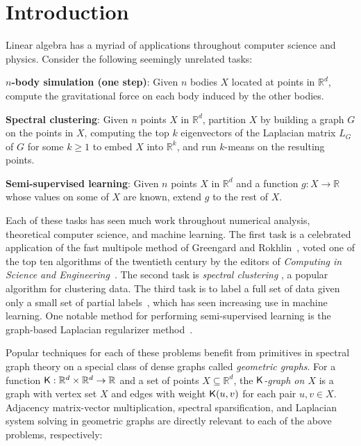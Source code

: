 \section{Introduction}\label{sec:intro}

Linear algebra has a myriad of applications throughout computer science and physics. Consider the following seemingly unrelated tasks:

\vspace{1mm}
\begin{compactenum}
    \item \textbf{$n$-body simulation (one step)}: Given $n$ bodies $X$ located at points in $\mathbb{R}^d$, compute the gravitational force on each body induced by the other bodies.
    \item \textbf{Spectral clustering}: Given $n$ points $X$ in $\mathbb{R}^d$, partition $X$ by building a graph $G$ on the points in $X$, computing the top $k$ eigenvectors of the Laplacian matrix $L_G$ of $G$ for some $k\ge 1$ to embed $X$ into $\mathbb{R}^k$, and run $k$-means on the resulting points.
    \item \textbf{Semi-supervised learning}: Given $n$ points $X$ in $\mathbb{R}^d$ and a function $g:X\rightarrow \mathbb{R}$ whose values on some of $X$ are known, extend $g$ to the rest of $X$.
\end{compactenum}

\vspace{1mm}

Each of these tasks has seen much work throughout numerical analysis, theoretical computer science, and machine learning. The first task is a celebrated application of the fast multipole method of Greengard and Rokhlin~\cite{gr87, gr88, gr89}, voted one of the top ten algorithms of the twentieth century by the editors of \emph{Computing in Science and Engineering}~\cite{dongarra2000guest}.
The second task is \emph{spectral clustering} \cite{njw02, lwdh13}, a popular algorithm for clustering data. The third task is to label a full set of data given only a small set of partial labels~\cite{z05survey, csbz09, zl05}, which has seen increasing use in machine learning. One notable method for performing semi-supervised learning is the graph-based Laplacian regularizer method~\cite{lszlh19,zl05, bns06,z05}.

Popular techniques for each of these problems benefit from primitives in spectral graph theory on a special class of dense graphs called \emph{geometric graphs}. For a function $\mathsf{K}:\mathbb{R}^d\times \mathbb{R}^d\rightarrow \mathbb{R}$ and a set of points $X\subseteq \mathbb{R}^d$, the \emph{$\mathsf{K}$-graph on $X$} is a graph with vertex set $X$ and edges with weight $\mathsf{K}(u,v)$ for each pair $u,v\in X$. Adjacency matrix-vector multiplication, spectral sparsification, and Laplacian system solving in geometric graphs are directly relevant to each of the above problems, respectively:

